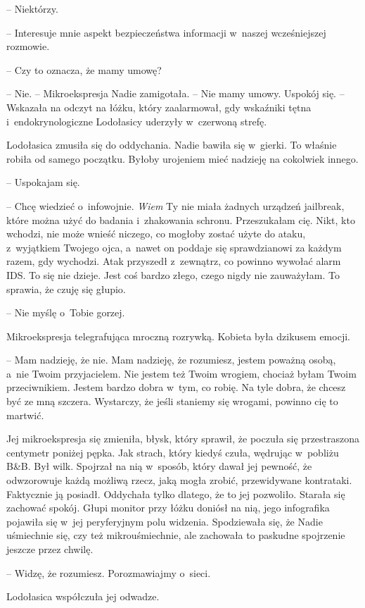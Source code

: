 \documentclass[oneside,polish,11pt,sfheadings]{mwbk}
\begin{document}
-- Niektórzy.

-- Interesuje mnie aspekt bezpieczeństwa informacji w~naszej
wcześniejszej rozmowie.

-- Czy to oznacza, że mamy umowę?

-- Nie. -- Mikroekspresja Nadie zamigotała. -- Nie mamy umowy. Uspokój się.
-- Wskazała na odczyt na łóżku, który zaalarmował, gdy wskaźniki tętna i~endokrynologiczne Lodołasicy uderzyły w~czerwoną strefę.

Lodołasica zmusiła się do oddychania. Nadie bawiła się w~gierki. To
właśnie robiła od samego początku. Byłoby urojeniem mieć nadzieję na
cokolwiek innego.

-- Uspokajam się.

-- Chcę wiedzieć o~infowojnie. \textit{Wiem} Ty nie miała żadnych urządzeń
jailbreak, które można użyć do badania i~zhakowania schronu.
Przeszukałam cię. Nikt, kto wchodzi, nie może wnieść niczego, co mogłoby
zostać użyte do ataku, z~wyjątkiem Twojego ojca, a~nawet on poddaje się
sprawdzianowi za każdym razem, gdy wychodzi. Atak przyszedł z~zewnątrz,
co powinno wywołać alarm IDS. To się nie dzieje. Jest coś bardzo złego,
czego nigdy nie zauważyłam. To sprawia, że czuję się głupio.

-- Nie myślę o~Tobie gorzej.

Mikroekspresja telegrafująca mroczną rozrywką. Kobieta była dzikusem
emocji.

-- Mam nadzieję, że nie. Mam nadzieję, że rozumiesz, jestem poważną
osobą, a~nie Twoim przyjacielem. Nie jestem też Twoim wrogiem, chociaż
byłam Twoim przeciwnikiem. Jestem bardzo dobra w~tym, co robię. Na tyle
dobra, że chcesz być ze mną szczera. Wystarczy, że jeśli staniemy się
wrogami, powinno cię to martwić.

Jej mikroekspresja się zmieniła, błysk, który sprawił, że poczuła się
przestraszona centymetr poniżej pępka. Jak strach, który kiedyś czuła,
wędrując w~pobliżu B\&B. Był wilk. Spojrzał na nią w~sposób, który dawał
jej pewność, że odwzorowuje każdą możliwą rzecz, jaką mogła zrobić,
przewidywane kontrataki. Faktycznie ją posiadł. Oddychała tylko dlatego,
że to jej pozwoliło. Starała się zachować spokój. Głupi monitor przy
łóżku doniósł na nią, jego infografika pojawiła się w~jej peryferyjnym
polu widzenia. Spodziewała się, że Nadie uśmiechnie się, czy też
mikrouśmiechnie, ale zachowała to paskudne spojrzenie jeszcze przez
chwilę.

-- Widzę, że rozumiesz. Porozmawiajmy o~sieci.

Lodołasica współczuła jej odwadze.
\end{document}

